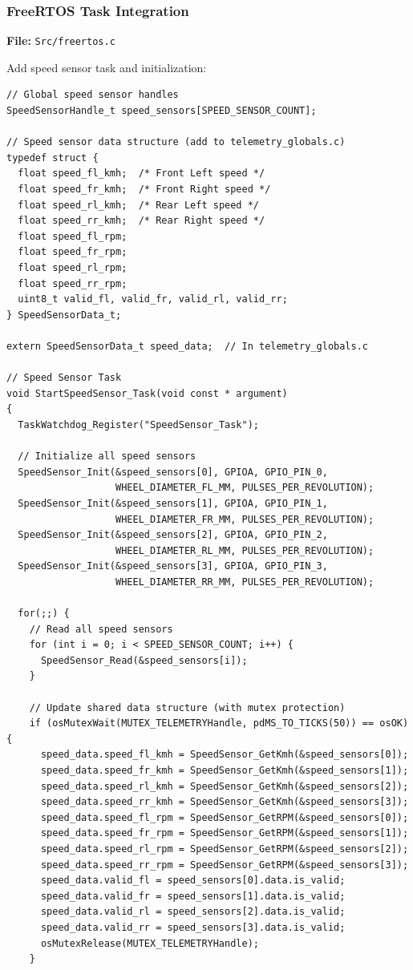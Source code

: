 \documentclass[11pt,a4paper]{article}
\begin{document}
\subsubsection{FreeRTOS Task Integration}

\textbf{File:} \texttt{Src/freertos.c}

Add speed sensor task and initialization:

\begin{lstlisting}[caption=Speed Sensor Task Implementation, label=lst:speedtask]
// Global speed sensor handles
SpeedSensorHandle_t speed_sensors[SPEED_SENSOR_COUNT];

// Speed sensor data structure (add to telemetry_globals.c)
typedef struct {
  float speed_fl_kmh;  /* Front Left speed */
  float speed_fr_kmh;  /* Front Right speed */
  float speed_rl_kmh;  /* Rear Left speed */
  float speed_rr_kmh;  /* Rear Right speed */
  float speed_fl_rpm;
  float speed_fr_rpm;
  float speed_rl_rpm;
  float speed_rr_rpm;
  uint8_t valid_fl, valid_fr, valid_rl, valid_rr;
} SpeedSensorData_t;

extern SpeedSensorData_t speed_data;  // In telemetry_globals.c

// Speed Sensor Task
void StartSpeedSensor_Task(void const * argument)
{
  TaskWatchdog_Register("SpeedSensor_Task");
  
  // Initialize all speed sensors
  SpeedSensor_Init(&speed_sensors[0], GPIOA, GPIO_PIN_0, 
                   WHEEL_DIAMETER_FL_MM, PULSES_PER_REVOLUTION);
  SpeedSensor_Init(&speed_sensors[1], GPIOA, GPIO_PIN_1, 
                   WHEEL_DIAMETER_FR_MM, PULSES_PER_REVOLUTION);
  SpeedSensor_Init(&speed_sensors[2], GPIOA, GPIO_PIN_2, 
                   WHEEL_DIAMETER_RL_MM, PULSES_PER_REVOLUTION);
  SpeedSensor_Init(&speed_sensors[3], GPIOA, GPIO_PIN_3, 
                   WHEEL_DIAMETER_RR_MM, PULSES_PER_REVOLUTION);
  
  for(;;) {
    // Read all speed sensors
    for (int i = 0; i < SPEED_SENSOR_COUNT; i++) {
      SpeedSensor_Read(&speed_sensors[i]);
    }
    
    // Update shared data structure (with mutex protection)
    if (osMutexWait(MUTEX_TELEMETRYHandle, pdMS_TO_TICKS(50)) == osOK) {
      speed_data.speed_fl_kmh = SpeedSensor_GetKmh(&speed_sensors[0]);
      speed_data.speed_fr_kmh = SpeedSensor_GetKmh(&speed_sensors[1]);
      speed_data.speed_rl_kmh = SpeedSensor_GetKmh(&speed_sensors[2]);
      speed_data.speed_rr_kmh = SpeedSensor_GetKmh(&speed_sensors[3]);
      speed_data.speed_fl_rpm = SpeedSensor_GetRPM(&speed_sensors[0]);
      speed_data.speed_fr_rpm = SpeedSensor_GetRPM(&speed_sensors[1]);
      speed_data.speed_rl_rpm = SpeedSensor_GetRPM(&speed_sensors[2]);
      speed_data.speed_rr_rpm = SpeedSensor_GetRPM(&speed_sensors[3]);
      speed_data.valid_fl = speed_sensors[0].data.is_valid;
      speed_data.valid_fr = speed_sensors[1].data.is_valid;
      speed_data.valid_rl = speed_sensors[2].data.is_valid;
      speed_data.valid_rr = speed_sensors[3].data.is_valid;
      osMutexRelease(MUTEX_TELEMETRYHandle);
    }
    

\end{lstlisting}
\end{document}
